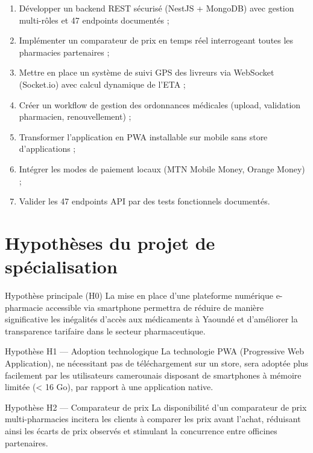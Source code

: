 \documentclass[12pt,a4paper,oneside]{report}
\begin{document}
\begin{enumerate}
  \item Développer un backend REST sécurisé (NestJS + MongoDB) avec gestion multi-rôles et 47 endpoints documentés ;
  \item Implémenter un comparateur de prix en temps réel interrogeant toutes les pharmacies partenaires ;
  \item Mettre en place un système de suivi GPS des livreurs via WebSocket (Socket.io) avec calcul dynamique de l'ETA ;
  \item Créer un workflow de gestion des ordonnances médicales (upload, validation pharmacien, renouvellement) ;
  \item Transformer l'application en PWA installable sur mobile sans store d'applications ;
  \item Intégrer les modes de paiement locaux (MTN Mobile Money, Orange Money) ;
  \item Valider les 47 endpoints API par des tests fonctionnels documentés.
\end{enumerate}

\section{Hypothèses du projet de spécialisation}

\begin{hypothese}{Hypothèse principale (H0)}
La mise en place d'une plateforme numérique e-pharmacie accessible via smartphone permettra de réduire de manière significative les inégalités d'accès aux médicaments à Yaoundé et d'améliorer la transparence tarifaire dans le secteur pharmaceutique.
\end{hypothese}

\begin{hypothese}{Hypothèse H1 — Adoption technologique}
La technologie PWA (Progressive Web Application), ne nécessitant pas de téléchargement sur un store, sera adoptée plus facilement par les utilisateurs camerounais disposant de smartphones à mémoire limitée (< 16 Go), par rapport à une application native.
\end{hypothese}

\begin{hypothese}{Hypothèse H2 — Comparateur de prix}
La disponibilité d'un comparateur de prix multi-pharmacies incitera les clients à comparer les prix avant l'achat, réduisant ainsi les écarts de prix observés et stimulant la concurrence entre officines partenaires.
\end{hypothese}
\end{document}
